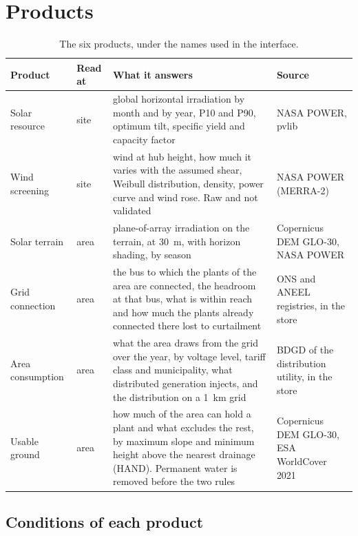 \documentclass[10pt,a4paper,oneside]{article}
\begin{document}
\section{Products}
\label{sec:produtos}

\begin{table}[H]
\begin{tabelalarga}
\caption{The six products, under the names used in the interface.}
\small
\begin{tabularx}{\linewidth}{L{27mm} l Y L{34mm}}
\toprule
\textbf{Product} & \textbf{Read at} & \textbf{What it answers} & \textbf{Source} \\
\midrule
Solar resource & site & global horizontal irradiation by month and by year,
  P10 and P90, optimum tilt, specific yield and capacity factor & NASA POWER,
  pvlib \\
Wind screening & site & wind at hub height, how much it varies with the
  assumed shear, Weibull distribution, density, power curve and wind rose.
  Raw and not validated & NASA POWER (MERRA-2) \\
Solar terrain & area & plane-of-array irradiation on the terrain, at
  \qty{30}{\metre}, with horizon shading, by season & Copernicus DEM GLO-30,
  NASA POWER \\
Grid connection & area & the bus to which the plants of the area are
  connected, the headroom at that bus, what is within reach and how much the
  plants already connected there lost to curtailment & ONS and ANEEL
  registries, in the store \\
Area consumption & area & what the area draws from the grid over the year,
  by voltage level, tariff class and municipality, what distributed
  generation injects, and the distribution on a \qty{1}{\kilo\metre} grid &
  BDGD of the distribution utility, in the store \\
Usable ground & area & how much of the area can hold a plant and what
  excludes the rest, by maximum slope and minimum height above the nearest
  drainage (HAND). Permanent water is removed before the two rules &
  Copernicus DEM GLO-30, ESA WorldCover 2021 \\
\bottomrule
\end{tabularx}
\end{tabelalarga}
\end{table}

\subsection{Conditions of each product}
\end{document}
